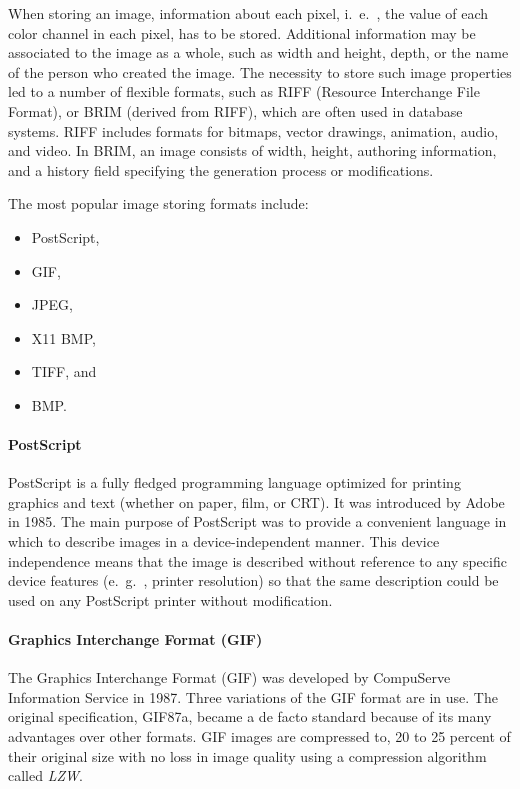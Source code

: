 When storing an image, information about each pixel, i.\ e.\ , the value of each color channel in each pixel, has to be stored. Additional information may be associated to the image as a whole, such as width and height, depth, or the name of the person who created the image. The necessity to store such image properties led to a number of flexible formats, such as RIFF (Resource Interchange File Format), or BRIM (derived from RIFF), which are often used in database systems. RIFF includes formats for bitmaps, vector drawings, animation, audio, and video. In BRIM, an image consists of width, height, authoring information, and a history field specifying the generation process or modifications.

The most popular image storing formats include: 
\begin{multicols}{2}
	\begin{itemize}
		\item PostScript, 
		\item GIF, 
		\item JPEG, 
		\item X11 BMP,
		\item TIFF, and 
		\item BMP.
	\end{itemize}
\end{multicols}


\paragraph*{PostScript}
PostScript is a fully fledged programming language optimized for printing graphics and text (whether on paper, film, or CRT). It was introduced by Adobe in 1985. The main purpose of PostScript was to provide a convenient language in which to describe images in a device-independent manner. This device independence means that the image is described without reference to any specific device features (e.\ g.\ , printer resolution) so that the same description could be used on any PostScript printer without modification.

\paragraph*{Graphics Interchange Format (GIF)}
The Graphics Interchange Format (GIF) was developed by CompuServe Information Service in 1987. Three variations of the GIF format are in use. The original specification, GIF87a, became a de facto standard because of its many advantages over other formats. GIF images are compressed to, 20 to 25 percent of their original size with no loss in image quality using a compression algorithm called \textit{LZW}.

